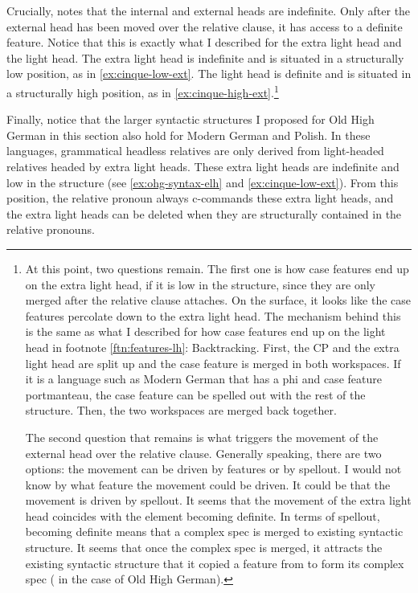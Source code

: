 Crucially, \citet{cinqueforthcoming} notes that the internal and external heads are indefinite. Only after the external head has been moved over the relative clause, it has access to a definite feature. Notice that this is exactly what I described for the extra light head and the light head. The extra light head is indefinite and is situated in a structurally low position, as in \ref{ex:cinque-low-ext}. The light head is definite and is situated in a structurally high position, as in \ref{ex:cinque-high-ext}.\footnote{
At this point, two questions remain. The first one is how case features end up on the extra light head, if it is low in the structure, since they are only merged after the relative clause attaches. On the surface, it looks like the case features percolate down to the extra light head. The mechanism behind this is the same as what I described for how case features end up on the light head in footnote \ref{ftn:features-lh}: Backtracking. First, the CP and the extra light head are split up and the case feature is merged in both workspaces. If it is a language such as Modern German that has a phi and case feature portmanteau, the case feature can be spelled out with the rest of the structure. Then, the two workspaces are merged back together.

The second question that remains is what triggers the movement of the external head over the relative clause. Generally speaking, there are two options: the movement can be driven by features or by spellout. I would not know by what feature the movement could be driven. It could be that the movement is driven by spellout. It seems that the movement of the extra light head coincides with the element becoming definite. In terms of spellout, becoming definite means that a complex spec is merged to existing syntactic structure. It seems that once the complex spec is merged, it attracts the existing syntactic structure that it copied a feature from to form its complex spec ( in the case of Old High German).
}

Finally, notice that the larger syntactic structures I proposed for Old High German in this section also hold for Modern German and Polish. In these languages, grammatical headless relatives are only derived from light-headed relatives headed by extra light heads. These extra light heads are indefinite and low in the structure (see \ref{ex:ohg-syntax-elh} and \ref{ex:cinque-low-ext}). From this position, the relative pronoun always c-commands these extra light heads, and the extra light heads can be deleted when they are structurally contained in the relative pronouns.


